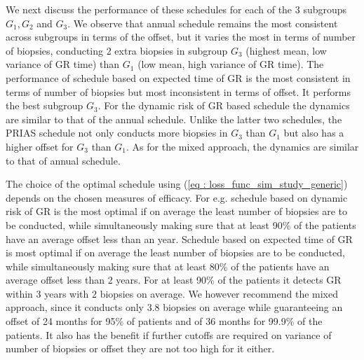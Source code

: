 We next discuss the performance of these schedules for each of the 3 subgroups $G_1, G_2$ and $G_3$. We observe that annual schedule remains the most consistent across subgroups in terms of the offset, but it varies the most in terms of number of biopsies, conducting 2 extra biopsies in subgroup $G_3$ (highest mean, low variance of GR time) than $G_1$ (low mean, high variance of GR time). The performance of schedule based on expected time of GR is the most consistent in terms of number of biopsies but most inconsistent in terms of offset. It performs the best subgroup $G_3$. For the dynamic risk of GR based schedule the dynamics are similar to that of the annual schedule. Unlike the latter two schedules, the PRIAS schedule not only conducts more biopsies in $G_3$ than $G_1$ but also has a higher offset for $G_3$ than $G_1$. As for the mixed approach, the dynamics are similar to that of annual schedule.

The choice of the optimal schedule using (\ref{eq : loss_func_sim_study_generic}) depends on the chosen measures of efficacy. For e.g. schedule based on dynamic risk of GR is the most optimal if on average the least number of biopsies are to be conducted, while simultaneously making sure that at least 90\% of the patients have an average offset less than an year. Schedule based on expected time of GR is most optimal if on average the least number of biopsies are to be conducted, while simultaneously making sure that at least 80\% of the patients have an average offset less than 2 years. For at least 90\% of the patients it detects GR within 3 years with 2 biopsies on average. We however recommend the mixed approach, since it conducts only 3.8 biopsies on average while guaranteeing an offset of 24 months for 95\% of patients and of 36 months for 99.9\% of the patients. It also has the benefit if further cutoffs are required on variance of number of biopsies or offset they are not too high for it either.